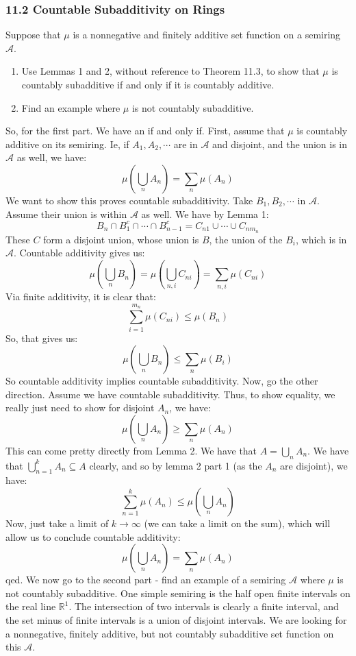 \documentclass[12pt,a4paper]{article}
\newcommand{\1}[1]{\mathbbm{1}\left\{ #1 \right\}}
\newcommand{\R}{\mathbb{R}}
\newcommand{\acal}{\mathcal{A}}
\begin{document}
\subsubsection{11.2 Countable Subadditivity on Rings} Suppose that $\mu$ is a nonnegative and finitely additive set function on a semiring $\acal$.
\begin{enumerate}
	\item Use Lemmas 1 and 2, without reference to Theorem 11.3, to show that $\mu$ is countably subadditive if and only if it is countably additive.
	
	\item Find an example where $\mu$ is not countably subadditive.
\end{enumerate}
So, for the first part. We have an if and only if. First, assume that $\mu$ is countably additive on its semiring. Ie, if $A_1, A_2, \cdots$ are in $\acal$ and disjoint, and the union is in $\acal$ as well, we have:
$$
	\mu\left(\bigcup_n A_n\right) = \sum_n\mu\left(A_n\right)
$$
We want to show this proves countable subadditivity. Take $B_1, B_2, \cdots$ in $\acal$. Assume their union is within $\acal$ as well. We have by Lemma 1:
$$
	B_n \cap B_1^c \cap \cdots \cap B_{n-1}^c = C_{n1} \cup \cdots \cup C_{nm_n}
$$
These $C$ form a disjoint union, whose union is $B$, the union of the $B_i$, which is in $\acal$. Countable additivity gives us:
$$
	\mu\left(\bigcup_n B_n\right) =
	\mu\left(\bigcup_{n,i} C_{ni}\right) =
	\sum_{n,i} \mu(C_{ni})
$$
Via finite additivity, it is clear that:
$$
	\sum_{i=1}^{m_n} \mu(C_{ni}) \leq \mu(B_n)
$$
So, that gives us:
$$
	\mu\left(\bigcup_n B_n\right) \leq \sum_n \mu(B_i)
$$
So countable additivity implies countable subadditivity. Now, go the other direction. Assume we have countable subadditivity. Thus, to show equality, we really just need to show for disjoint $A_n$, we have:
$$
	\mu\left(\bigcup_n A_n\right) \geq \sum_n\mu\left(A_n\right)
$$
This can come pretty directly from Lemma 2. We have that $A = \bigcup_n A_n$. We have that $\bigcup_{n=1}^k A_n \subseteq A$ clearly, and so by lemma 2 part 1 (as the $A_n$ are disjoint), we have:
$$
	\sum_{n=1}^k\mu\left(A_n\right) \leq \mu\left(\bigcup_n A_n\right)
$$
Now, just take a limit of $k \to \infty$ (we can take a limit on the sum), which will allow us to conclude countable additivity:
$$
	\mu\left(\bigcup_n A_n\right) = \sum_n\mu\left(A_n\right)
$$
qed. We now go to the second part - find an example of a semiring $\acal$ where $\mu$ is not countably subadditive. One simple semiring is the half open finite intervals on the real line $\R^1$. The intersection of two intervals is clearly a finite interval, and the set minus of finite intervals is a union of disjoint intervals. We are looking for a nonnegative, finitely additive, but not countably subadditive set function on this $\acal$.
\end{document}
